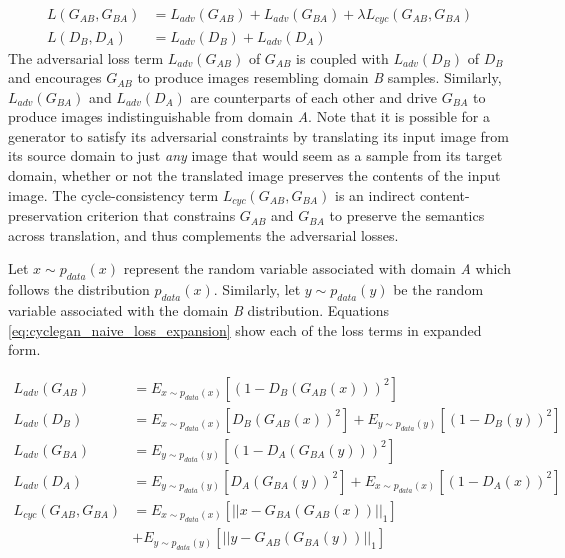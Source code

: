 \begin{equation}
    \begin{aligned}
    L(G_{AB}, G_{BA}) &= L_{adv}(G_{AB}) + L_{adv}(G_{BA}) + \lambda L_{cyc}(G_{AB}, G_{BA}) \\[1mm]
    L(D_B, D_A) &= L_{adv}(D_B) + L_{adv}(D_A)
    \end{aligned}
    \label{eq:cyclegan_naive_loss_components}
\end{equation}
The adversarial loss term $L_{adv}(G_{AB})$ of $G_{AB}$ is coupled with $L_{adv}(D_B)$ of $D_B$ and encourages $G_{AB}$ to produce images resembling domain \textit{B} samples. Similarly, $L_{adv}(G_{BA})$ and $L_{adv}(D_A)$ are counterparts of each other and drive $G_{BA}$ to produce images indistinguishable from domain \textit{A}. Note that it is possible for a generator to satisfy its adversarial constraints by translating its input image from its source domain to just \textit{any} image that would seem as a sample from its target domain, whether or not the translated image preserves the contents of the input image. The cycle-consistency term $L_{cyc}(G_{AB}, G_{BA})$ is an indirect content-preservation criterion that constrains $G_{AB}$ and $G_{BA}$ to preserve the semantics across translation, and thus complements the adversarial losses. 

Let $x \sim p_{data}(x)$ represent the random variable associated with domain \textit{A} which follows the distribution $p_{data}(x)$. Similarly, let $y \sim p_{data}(y)$ be the random variable associated with the domain \textit{B} distribution. Equations \ref{eq:cyclegan_naive_loss_expansion} show each of the loss terms in expanded form.

\begin{equation}
    \begin{aligned}
    L_{adv}(G_{AB}) &= E_{x \sim p_{data}(x)} [(1 - D_B(G_{AB}(x)))^2]  \\[1mm]
    L_{adv}(D_B) &= E_{x \sim p_{data}(x)} [D_B(G_{AB}(x))^2] + E_{y \sim p_{data}(y)} [(1 - D_B(y))^2] \\[4mm]
    L_{adv}(G_{BA}) &= E_{y \sim p_{data}(y)} [(1 - D_A(G_{BA}(y)))^2]  \\[1mm]
    L_{adv}(D_A) &= E_{y \sim p_{data}(y)} [D_A(G_{BA}(y))^2] + E_{x \sim p_{data}(x)} [(1 - D_A(x))^2] \\[4mm]
    L_{cyc}(G_{AB}, G_{BA}) &= E_{x \sim p_{data}(x)} [|| x - G_{BA}(G_{AB}(x)) ||_1]  \\
                            &+ E_{y \sim p_{data}(y)} [|| y - G_{AB}(G_{BA}(y)) ||_1] 
    \end{aligned}
    \label{eq:cyclegan_naive_loss_expansion}
\end{equation}

